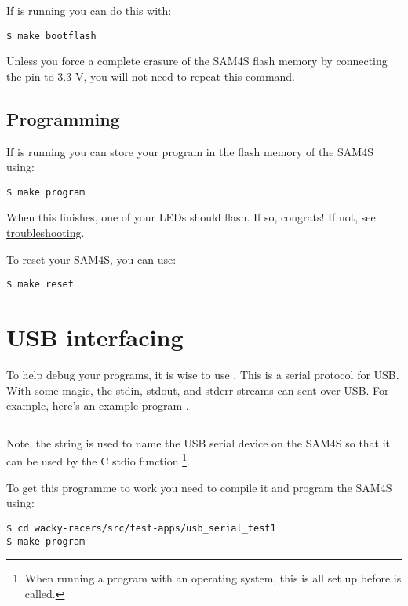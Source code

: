 If  is running you can do this with:

\begin{verbatim}
$ make bootflash
\end{verbatim}

Unless you force a complete erasure of the SAM4S flash memory by
connecting the  pin to 3.3 V, you will not need to repeat
this command.

\subsection{Programming}
\label{programming}

If  is running you can store your program in the flash
memory of the SAM4S using:

\begin{verbatim}
$ make program
\end{verbatim}

When this finishes, one of your LEDs should flash. If so, congrats! If
not, see \protect\hyperref[troubleshooting]{troubleshooting}.

To reset your SAM4S, you can use:
%
\begin{verbatim}
$ make reset
\end{verbatim}

\section{USB interfacing}
\label{usb-interfacing}

To help debug your programs, it is wise to use .  This is a serial protocol for USB.  With some magic, the
stdin, stdout, and stderr streams can sent over USB.  For example,
here's an example program
.

\inputminted{C}{../../src/test-apps/usb_serial_test1/usb_serial_test1.c}

Note, the string  is used to name the USB serial
device on the SAM4S so that it can be used by the C stdio function
\footnote{When running a program with an operating
  system, this is all set up before  is called.}.

To get this programme to work you need to compile it and program the SAM4S using:

\begin{verbatim}
$ cd wacky-racers/src/test-apps/usb_serial_test1
$ make program
\end{verbatim}


